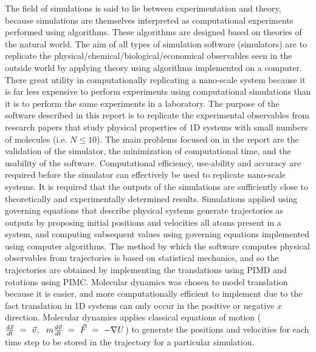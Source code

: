 \documentclass[11pt]{article}
\begin{document}
The field of simulations is said to lie between experimentation and theory, because simulations are themselves interpreted as computational experiments performed using algorithms. These algorithms are designed based on theories of the natural world. The aim of all types of simulation software (simulators) are to replicate the physical/chemical/biological/economical observables seen in the outside world by applying theory using algorithms implemented on a computer. There great utility in computationally replicating a nano-scale system because it is far less expensive to perform experiments using computational simulations than it is to perform the same experiments in a laboratory. The purpose of the software described in this report is to replicate the experimental observables from research papers that study physical properties of 1D systems with small numbers of molecules (i.e. \begin{math} N \leq 10 \end{math}). The main problems focused on in the report are the validation of the simulator, the minimization of computational time, and the usability of the software. Computational efficiency, use-ability and accuracy are required before the simulator can effectively be used to replicate nano-scale systems. It is required that the outputs of the simulations are sufficiently close to theoretically and experimentally determined results. Simulations applied using governing equations that describe physical systems generate trajectories as outputs by proposing initial positions and velocities all atoms present in a system, and computing subsequent values using governing equations implemented using computer algorithms. The method by which the software computes physical observables from trajectories is based on statistical mechanics, and so the trajectories are obtained by implementing the translations using PIMD and rotations using PIMC. Molecular dynamics was chosen to model translation because it is easier, and more computationally efficient to implement due to the fact translation in 1D systems can only occur in the positive or negative \begin{math} x \end{math} direction. Molecular dynamics applies classical equations of motion (\begin{math}\frac{d \vec{x}}{dt} \hspace{0.125cm} = \hspace{0.125cm} \vec{v} \hspace{0.025cm} , \hspace{0.225cm} m \frac{d \vec{v}}{dt} \hspace{0.125cm} = \hspace{0.125cm} \vec{F} \hspace{0.125cm} = \hspace{0.125cm} - \nabla{U} \end{math}) to generate the positions and velocities for each time step to be stored in the trajectory for a particular simulation. 
\end{document}
